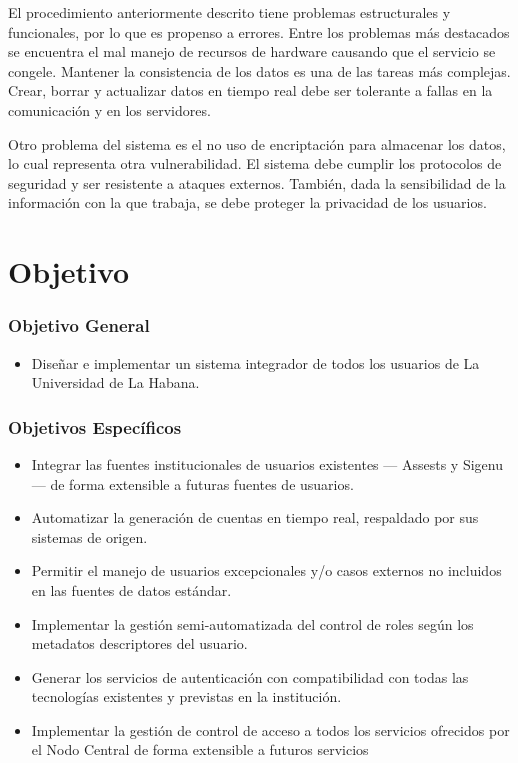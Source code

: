 El procedimiento anteriormente descrito tiene problemas estructurales y funcionales, por lo que es propenso a errores. Entre los problemas más destacados se encuentra el mal manejo de recursos de hardware causando que el servicio se congele. Mantener la consistencia de los datos es una de las tareas m\'as complejas. Crear, borrar y actualizar  datos en tiempo real  debe ser tolerante a fallas en la comunicaci\'on y en los servidores. 

Otro problema del sistema es el no uso de encriptación para almacenar los datos, lo cual representa otra vulnerabilidad. El sistema debe cumplir los protocolos de seguridad y ser resistente a ataques externos. Tambi\'en, dada la sensibilidad de la informaci\'on con la que trabaja, se debe proteger la privacidad de los usuarios.

\section*{Objetivo}

\subsubsection*{Objetivo General}

\begin{itemize}	
	\item Diseñar e implementar un sistema integrador de todos los usuarios de La Universidad de La Habana. 
\end{itemize}

\subsubsection*{Objetivos Específicos}
\begin{itemize}	
	\item Integrar las fuentes institucionales de usuarios existentes — Assests y Sigenu — de forma extensible a futuras fuentes de usuarios.
	\item Automatizar la generación de cuentas en tiempo real, respaldado por sus sistemas de origen.
	\item Permitir el manejo de usuarios excepcionales y/o casos externos no incluidos en las fuentes de datos estándar.
	\item Implementar la gestión semi-automatizada del control de roles según los metadatos descriptores del usuario.
	\item Generar los servicios de autenticación con compatibilidad con todas las tecnologías existentes y previstas en la institución.
	\item Implementar la gestión de control de acceso a todos los servicios ofrecidos por el Nodo Central de forma extensible a futuros servicios
\end{itemize}